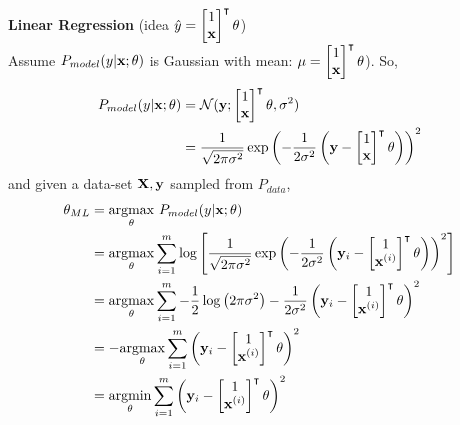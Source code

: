 \begin{example}
    \textbf{Linear Regression} (idea $\hat{y} = \begin{bmatrix} 1 \\ \vx \end{bmatrix}^\intercal\vtheta$) \\
    Assume $P_{model}(y|\vx ; \vtheta)$ is Gaussian with mean: $\mu = \begin{bmatrix} 1 \\ \vx \end{bmatrix}^\intercal\vtheta$).
    So, 
    \begin{align*}
        P_{model}(y|\vx;\theta) &= \Normal(\vy;\begin{bmatrix} 1 \\ \vx \end{bmatrix}^\intercal\vtheta,\sigma^2)\\
        &=\frac{1}{\sqrt{2\pi\sigma^2}}\exp{\left(-\frac{1}{2\sigma^2}\left(\vy - \begin{bmatrix} 1 \\ \vx \end{bmatrix}^\intercal\vtheta \right) \right)^2} \\
    \end{align*}
    and given a data-set $\MX,\vy$ sampled from $P_{data}$, 
    \begin{align*}
        \vtheta_{ML} & = \underset{\vtheta}{\argmax}\ P_{model}(y|\vx;\theta) \\
        &= \underset{\vtheta}{\argmax}\sum_{i=1}^m\log\left[\frac{1}{\sqrt{2\pi\sigma^2}}\exp{\left(-\frac{1}{2\sigma^2}\left(\vy_i - \begin{bmatrix} 1 \\ \vx^{(i)} \end{bmatrix}^\intercal\vtheta \right) \right)^2} \right]\\
        &= \underset{\vtheta}{\argmax}\sum_{i=1}^m -\frac{1}{2}\log\left(2\pi\sigma^2\right) - \frac{1}{2\sigma^2}\left(\vy_i - \begin{bmatrix} 1 \\ \vx^{(i)} \end{bmatrix}^\intercal\vtheta \right)^2\\
        &= -\underset{\vtheta}{\argmax}\sum_{i=1}^m\left(\vy_i - \begin{bmatrix} 1 \\ \vx^{(i)} \end{bmatrix}^\intercal\vtheta \right)^2\\
        &= \underset{\vtheta}{\argmin}\sum_{i=1}^m\left(\vy_i - \begin{bmatrix} 1 \\ \vx^{(i)} \end{bmatrix}^\intercal\vtheta \right)^2\\

\end{align*}
\end{example}
